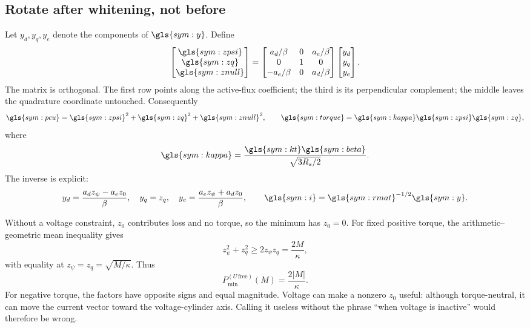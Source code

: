 \subsection{Rotate after whitening, not before}

Let \(y_d,y_q,y_e\) denote the components of \(\gls{sym:y}\). Define
\begin{equation}
 \begin{bmatrix}\gls{sym:zpsi}\\\gls{sym:zq}\\\gls{sym:znull}\end{bmatrix}
 =\begin{bmatrix}
 a_d/\beta&0&a_e/\beta\\
 0&1&0\\
 -a_e/\beta&0&a_d/\beta
 \end{bmatrix}
 \begin{bmatrix}y_d\\y_q\\y_e\end{bmatrix}.
 \label{eq:torque-rotation}
\end{equation}
The matrix is orthogonal. The first row points along the active-flux
coefficient; the third is its perpendicular complement; the middle leaves the
quadrature coordinate untouched. Consequently
\begin{equation}
 \gls{sym:pcu}=\gls{sym:zpsi}^2+\gls{sym:zq}^2+\gls{sym:znull}^2,
 \qquad
 \gls{sym:torque}=\gls{sym:kappa}\gls{sym:zpsi}\gls{sym:zq},
 \label{eq:canonical-product}
\end{equation}
where
\begin{equation}
 \gls{sym:kappa}=\frac{\gls{sym:kt}\gls{sym:beta}}{\sqrt{3R_s/2}}.
 \label{eq:kappa}
\end{equation}
The inverse is explicit:
\begin{equation}
 y_d=\frac{a_dz_\psi-a_ez_0}{\beta},\quad y_q=z_q,\quad
 y_e=\frac{a_ez_\psi+a_dz_0}{\beta},\qquad
 \gls{sym:i}=\gls{sym:rmat}^{-1/2}\gls{sym:y}.
 \label{eq:torque-inverse}
\end{equation}

Without a voltage constraint, \(z_0\) contributes loss and no torque, so the
minimum has \(z_0=0\). For fixed positive torque, the arithmetic--geometric
mean inequality gives
\begin{equation}
 z_\psi^2+z_q^2\geq2z_\psi z_q=\frac{2M}{\kappa},
\end{equation}
with equality at \(z_\psi=z_q=\sqrt{M/\kappa}\). Thus
\begin{equation}
 P_{\min}^{(U\,\mathrm{free})}(M)=\frac{2|M|}{\kappa}.
 \label{eq:unconstrained-minloss}
\end{equation}
For negative torque, the factors have opposite signs and equal magnitude.
Voltage can make a nonzero \(z_0\) useful: although torque-neutral, it can move
the current vector toward the voltage-cylinder axis. Calling it useless
without the phrase ``when voltage is inactive'' would therefore be wrong.


